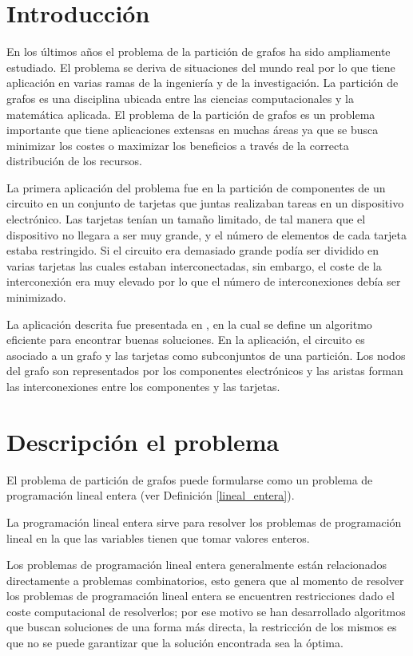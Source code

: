 \section{Introducción}
En los últimos años el problema de la partición de grafos ha sido ampliamente estudiado. El problema se deriva de situaciones del mundo real por lo que tiene aplicación en varias ramas de la ingeniería y de la investigación. La partición de grafos es una disciplina ubicada entre las ciencias computacionales y la matemática aplicada. El problema de la partición de grafos es un problema importante que tiene aplicaciones extensas en muchas áreas ya que se busca minimizar los costes o maximizar los beneficios a través de la correcta distribución de los recursos. 

La primera aplicación del problema fue en la partición de componentes de un circuito en un conjunto de tarjetas que juntas realizaban tareas en un dispositivo electrónico. Las tarjetas tenían un tamaño limitado, de tal manera que el dispositivo no llegara a ser muy grande, y el número de elementos de cada tarjeta estaba restringido. Si el circuito era demasiado grande podía ser dividido en varias tarjetas las cuales estaban interconectadas, sin embargo, el coste de la interconexión era muy elevado por lo que el número de interconexiones debía ser minimizado.

La aplicación descrita fue presentada en \cite{KernighanLin}, en la cual se define un algoritmo eficiente para encontrar buenas soluciones. En la aplicación, el circuito es asociado a un grafo y las tarjetas como subconjuntos de una partición. Los nodos del grafo son representados por los componentes electrónicos y las aristas forman las interconexiones entre los componentes y las tarjetas.

\section{Descripción el problema}

El problema de partición de grafos puede formularse como un problema de programación lineal entera (ver Definición \ref{lineal_entera}). 

\begin{mydef}\label{lineal_entera}
	La programación lineal entera sirve para resolver los problemas de programación lineal en la que las variables tienen que tomar valores enteros.
\end{mydef}

Los problemas de programación lineal entera generalmente están relacionados directamente a problemas combinatorios, esto genera que al momento de resolver los problemas de programación lineal entera se encuentren restricciones dado el coste computacional de resolverlos; por ese motivo se han desarrollado algoritmos que buscan soluciones de una forma más directa, la restricción de los mismos es que no se puede garantizar que la solución encontrada sea la óptima. 

